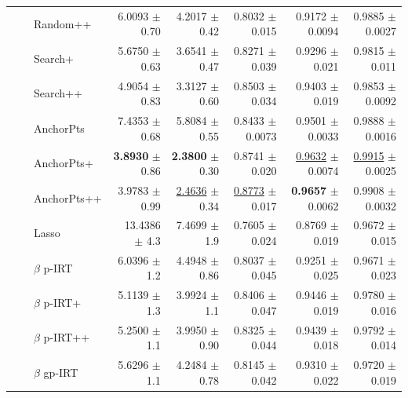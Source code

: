 \begin{longtable}{llp{}rrrrr}
 &  & Random++ & 6.0093 {\scriptsize $\pm$ 0.70} & 4.2017 {\scriptsize $\pm$ 0.42} & 0.8032 {\scriptsize $\pm$ 0.015} & 0.9172 {\scriptsize $\pm$ 0.0094} & 0.9885 {\scriptsize $\pm$ 0.0027} \\
 &  & Search+ & 5.6750 {\scriptsize $\pm$ 0.63} & 3.6541 {\scriptsize $\pm$ 0.47} & 0.8271 {\scriptsize $\pm$ 0.039} & 0.9296 {\scriptsize $\pm$ 0.021} & 0.9815 {\scriptsize $\pm$ 0.011} \\
 &  & Search++ & 4.9054 {\scriptsize $\pm$ 0.83} & 3.3127 {\scriptsize $\pm$ 0.60} & 0.8503 {\scriptsize $\pm$ 0.034} & 0.9403 {\scriptsize $\pm$ 0.019} & 0.9853 {\scriptsize $\pm$ 0.0092} \\
 &  & AnchorPts & 7.4353 {\scriptsize $\pm$ 0.68} & 5.8084 {\scriptsize $\pm$ 0.55} & 0.8433 {\scriptsize $\pm$ 0.0073} & 0.9501 {\scriptsize $\pm$ 0.0033} & 0.9888 {\scriptsize $\pm$ 0.0016} \\
 &  & AnchorPts+ & \textbf{3.8930} {\scriptsize $\pm$ 0.86} & \textbf{2.3800} {\scriptsize $\pm$ 0.30} & 0.8741 {\scriptsize $\pm$ 0.020} & \underline{0.9632} {\scriptsize $\pm$ 0.0074} & \underline{0.9915} {\scriptsize $\pm$ 0.0025} \\
 &  & AnchorPts++ & 3.9783 {\scriptsize $\pm$ 0.99} & \underline{2.4636} {\scriptsize $\pm$ 0.34} & \underline{0.8773} {\scriptsize $\pm$ 0.017} & \textbf{0.9657} {\scriptsize $\pm$ 0.0062} & 0.9908 {\scriptsize $\pm$ 0.0032} \\
 &  & Lasso & 13.4386 {\scriptsize $\pm$ 4.3} & 7.4699 {\scriptsize $\pm$ 1.9} & 0.7605 {\scriptsize $\pm$ 0.024} & 0.8769 {\scriptsize $\pm$ 0.019} & 0.9672 {\scriptsize $\pm$ 0.015} \\
 &  & $\beta$ p-IRT & 6.0396 {\scriptsize $\pm$ 1.2} & 4.4948 {\scriptsize $\pm$ 0.86} & 0.8037 {\scriptsize $\pm$ 0.045} & 0.9251 {\scriptsize $\pm$ 0.025} & 0.9671 {\scriptsize $\pm$ 0.023} \\
 &  & $\beta$ p-IRT+ & 5.1139 {\scriptsize $\pm$ 1.3} & 3.9924 {\scriptsize $\pm$ 1.1} & 0.8406 {\scriptsize $\pm$ 0.047} & 0.9446 {\scriptsize $\pm$ 0.019} & 0.9780 {\scriptsize $\pm$ 0.016} \\
 &  & $\beta$ p-IRT++ & 5.2500 {\scriptsize $\pm$ 1.1} & 3.9950 {\scriptsize $\pm$ 0.90} & 0.8325 {\scriptsize $\pm$ 0.044} & 0.9439 {\scriptsize $\pm$ 0.018} & 0.9792 {\scriptsize $\pm$ 0.014} \\
 &  & $\beta$ gp-IRT & 5.6296 {\scriptsize $\pm$ 1.1} & 4.2484 {\scriptsize $\pm$ 0.78} & 0.8145 {\scriptsize $\pm$ 0.042} & 0.9310 {\scriptsize $\pm$ 0.022} & 0.9720 {\scriptsize $\pm$ 0.019} \\

\end{longtable}
